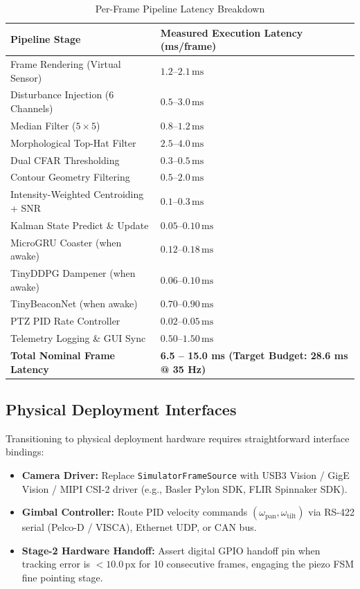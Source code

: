 \documentclass[11pt,a4paper]{article}
\begin{document}
\begin{table}[htbp]
\centering
\small
\caption{Per-Frame Pipeline Latency Breakdown}
\label{tab:compute_breakdown}
\begin{tabularx}{\linewidth}{@{}p{7.0cm} X@{}}
\toprule
\textbf{Pipeline Stage} & \textbf{Measured Execution Latency (ms/frame)} \\
\midrule
Frame Rendering (Virtual Sensor)     & $1.2$--$2.1\,\text{ms}$ \\
Disturbance Injection (6 Channels)   & $0.5$--$3.0\,\text{ms}$ \\
Median Filter ($5\times 5$)          & $0.8$--$1.2\,\text{ms}$ \\
Morphological Top-Hat Filter         & $2.5$--$4.0\,\text{ms}$ \\
Dual CFAR Thresholding               & $0.3$--$0.5\,\text{ms}$ \\
Contour Geometry Filtering           & $0.5$--$2.0\,\text{ms}$ \\
Intensity-Weighted Centroiding + SNR & $0.1$--$0.3\,\text{ms}$ \\
Kalman State Predict \& Update       & $0.05$--$0.10\,\text{ms}$ \\
MicroGRU Coaster (when awake)        & $0.12$--$0.18\,\text{ms}$ \\
TinyDDPG Dampener (when awake)       & $0.06$--$0.10\,\text{ms}$ \\
TinyBeaconNet (when awake)           & $0.70$--$0.90\,\text{ms}$ \\
PTZ PID Rate Controller              & $0.02$--$0.05\,\text{ms}$ \\
Telemetry Logging \& GUI Sync        & $0.50$--$1.50\,\text{ms}$ \\
\midrule
\textbf{Total Nominal Frame Latency} & \textbf{6.5 -- 15.0 ms (Target Budget: 28.6 ms @ 35 Hz)} \\
\bottomrule
\end{tabularx}
\end{table}

\subsection{Physical Deployment Interfaces}
Transitioning to physical deployment hardware requires straightforward interface bindings:
\begin{itemize}[noitemsep,topsep=2pt]
    \item \textbf{Camera Driver:} Replace \texttt{SimulatorFrameSource} with USB3 Vision / GigE Vision / MIPI CSI-2 driver (e.g., Basler Pylon SDK, FLIR Spinnaker SDK).
    \item \textbf{Gimbal Controller:} Route PID velocity commands $(\omega_{\text{pan}}, \omega_{\text{tilt}})$ via RS-422 serial (Pelco-D / VISCA), Ethernet UDP, or CAN bus.
    \item \textbf{Stage-2 Hardware Handoff:} Assert digital GPIO handoff pin when tracking error is $< 10.0\,\text{px}$ for 10 consecutive frames, engaging the piezo FSM fine pointing stage.
\end{itemize}
\end{document}
